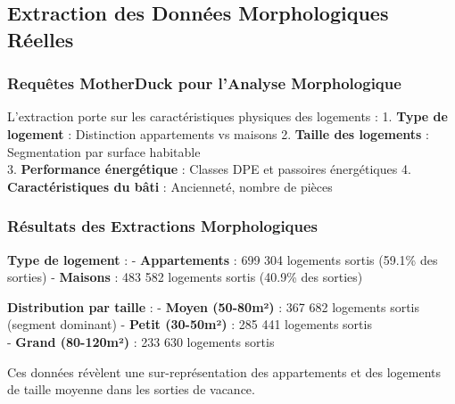 \documentclass[11pt]{article}
\begin{document}
    \subsection{Extraction des Données Morphologiques
Réelles}\label{extraction-des-donnuxe9es-morphologiques-ruxe9elles}

\subsubsection{Requêtes MotherDuck pour l'Analyse
Morphologique}\label{requuxeates-motherduck-pour-lanalyse-morphologique}

L'extraction porte sur les caractéristiques physiques des logements : 1.
\textbf{Type de logement} : Distinction appartements vs maisons 2.
\textbf{Taille des logements} : Segmentation par surface habitable\\
3. \textbf{Performance énergétique} : Classes DPE et passoires
énergétiques 4. \textbf{Caractéristiques du bâti} : Ancienneté, nombre
de pièces

\subsubsection{Résultats des Extractions
Morphologiques}\label{ruxe9sultats-des-extractions-morphologiques}

\textbf{Type de logement} : - \textbf{Appartements} : 699 304 logements
sortis (59.1\% des sorties) - \textbf{Maisons} : 483 582 logements
sortis (40.9\% des sorties)

\textbf{Distribution par taille} : - \textbf{Moyen (50-80m²)} : 367 682
logements sortis (segment dominant) - \textbf{Petit (30-50m²)} : 285 441
logements sortis\\
- \textbf{Grand (80-120m²)} : 233 630 logements sortis

Ces données révèlent une sur-représentation des appartements et des
logements de taille moyenne dans les sorties de vacance.
\end{document}
